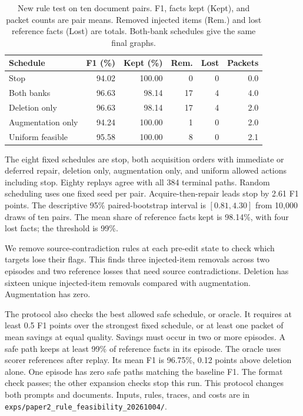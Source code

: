 \begin{table}[t]
\centering
\caption{New rule test on ten document pairs. F1, facts kept (Kept), and packet counts are pair means. Removed injected items (Rem.) and lost reference facts (Lost) are totals. Both-bank schedules give the same final graphs.}
\label{tab:new_rule_feasibility}
\small
\setlength{\tabcolsep}{3pt}
\begin{tabular}{lrrrrr}
\toprule
Schedule & F1 (\%) & Kept (\%) & Rem. & Lost & Packets \\
\midrule
Stop & 94.02 & 100.00 & 0 & 0 & 0.0 \\
Both banks & 96.63 & 98.14 & 17 & 4 & 4.0 \\
Deletion only & 96.63 & 98.14 & 17 & 4 & 2.0 \\
Augmentation only & 94.24 & 100.00 & 1 & 0 & 2.0 \\
Uniform feasible & 95.58 & 100.00 & 8 & 0 & 2.1 \\
\bottomrule
\end{tabular}
\end{table}

The eight fixed schedules are stop, both acquisition orders with immediate
or deferred repair, deletion only, augmentation only, and uniform allowed
actions including stop. Eighty replays agree with all 384 terminal paths.
Random scheduling uses one fixed seed per pair.
Acquire-then-repair leads stop by 2.61 F1 points. The descriptive 95\%
paired-bootstrap interval is $[0.81,4.30]$ from 10,000 draws of ten pairs.
The mean share of reference facts kept is 98.14\%, with four lost facts; the threshold is 99\%.

We remove source-contradiction rules at each pre-edit state to check which
targets lose their flags. This finds three injected-item removals across
two episodes and two reference losses that need source contradictions.
Deletion has sixteen unique injected-item removals compared with
augmentation. Augmentation has zero.

The protocol also checks the best allowed safe schedule, or oracle.
It requires at least 0.5 F1 points over the strongest fixed schedule,
or at least one packet of mean savings at equal quality.
Savings must occur in two or more episodes. A safe path keeps at least
99\% of reference facts in its episode. The oracle uses scorer references
after replay. Its mean F1 is 96.75\%, 0.12 points above deletion alone.
One episode has zero safe paths matching the baseline F1.
The format check passes; the other expansion checks stop this run.
This protocol changes both prompts and documents. Inputs, rules,
traces, and costs are in
\texttt{exps/paper2\_rule\_feasibility\_20261004/}.

